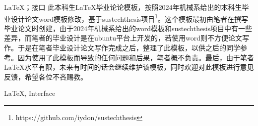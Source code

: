 \begin{中文摘要}{\LaTeX ；接口}
  此本科生\LaTeX 毕业论论模板，按照2024年机械系给出的本科生毕业设计论文word模板修改，基于sustechthesis项目\footnote{https://github.com/iydon/sustechthesis}。这个模板最初由笔者在撰写毕业论文时创建，由于2024年机械系给出的word模板和sustechthesis项目中有一些差异，而笔者的毕业设计是在ubuntu平台上开发的，若使用word则不方便论文写作。于是在笔者毕业设计论文写作完成之后，整理了此模板，以供之后的同学参考。因为使用了此模板而导致的任何问题和后果，笔者概不负责。最后，由于笔者\LaTeX 水平有限，未来有时间的话会继续维护该模板，同时欢迎对此模板进行意见反馈，希望各位不吝赐教。
\end{中文摘要}

\begin{英文摘要}{LaTeX, Interface}
  \lipsum[1]
\end{英文摘要}

